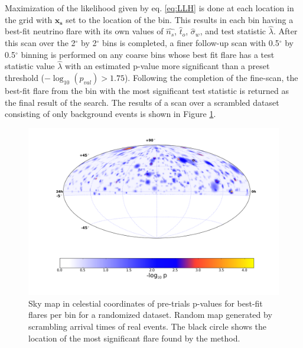 \documentclass{gatech-thesis}
\begin{document}
Maximization of the likelihood given by eq. \eqref{eq:LLH} is done at each location in the grid with $\mathbf{x_s}$ set to the location of the bin. This results in each bin having a best-fit neutrino flare with its own values of $\hat{n_s}$, $\hat{t}_o$, $\hat{\sigma}_w$, and test statistic $\hat{\lambda}$. After this scan over the 2$^{\circ}$ by 2$^{\circ}$ bins is completed, a finer follow-up scan with 0.5$^{\circ}$ by 0.5$^{\circ}$ binning is performed on any coarse bins whose best fit flare has a test statistic value $\hat{\lambda}$ with an estimated p-value more significant than a preset threshold ($-\log_{10}(p_{val}) > 1.75$). Following the completion of the fine-scan, the best-fit flare from the bin with the most significant test statistic is returned as the final result of the search. The results of a scan over a scrambled dataset consisting of only background events is shown in Figure \ref{fig:NullTrialSkyMap}.
\begin{figure}[ht]
  \begin{center}
    \includegraphics[width=1.0\textwidth,keepaspectratio]{NullMap996.png}
  \end{center}
  \caption[Sky Map of Results from a Background Scrambled Trial]{Sky map in celestial coordinates of pre-trials p-values for best-fit flares per bin for a randomized dataset. Random map generated by scrambling arrival times of real events. The black circle shows the location of the most significant flare found by the method.}
  \label{fig:NullTrialSkyMap}
\end{figure}
\end{document}
